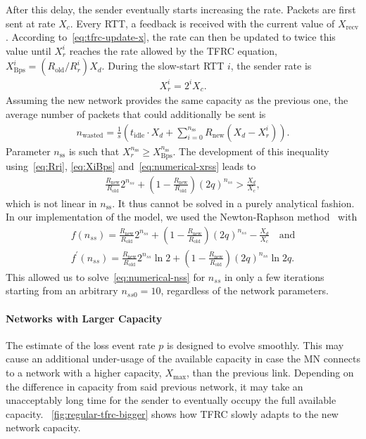 \documentclass[twocolumn]{nictatechreport}
\begin{document}
After this delay, the sender eventually starts increasing the rate. Packets are
first sent at rate $X_c$. Every RTT, a feedback is received with the current
value of $X_\mathrm{recv}$. According to~\eqref{eq:tfrc-update-x}, the rate can
then be updated to twice this value until $X_r^i$ reaches the rate allowed by
the TFRC equation, $X_\mathrm{Bps}^i = (R_\mathrm{old}/R_r^i)X_d$. During
the slow-start RTT $i$, the sender rate is
\begin{gather}
  \label{eq:numerical-xrss}
  X_r^i = 2^i X_c.
\end{gather}
Assuming the new network provides the same capacity as the previous one, the
average number of packets that could additionally be sent is 
\begin{gather}
  n_\mathrm{wasted} = \frac1s\left(t_\mathrm{idle} \cdot X_d + \sum_{i=0}^{n_\mathrm{ss}} R_\mathrm{new}
  \left( X_d - X_r^i \right)\right).
  \label{eq:numerical-packets-wasted}
\end{gather}
Parameter $n_\mathrm{ss}$ is such that $X_r^{n_\mathrm{ss}} \ge
X_\mathrm{Bps}^{n_\mathrm{ss}}$. The development of this inequality
using~\eqref{eq:Rri}, \eqref{eq:XiBps} and~\eqref{eq:numerical-xrss} leads to
\begin{gather}
  \frac{R_\mathrm{new}}{R_\mathrm{old}}2^{n_{ss}} + \left(1-\frac{R_\mathrm{new}}{R_\mathrm{old}}\right)(2q)^{n_{ss}} > \frac{X_d}{X_c},
  \label{eq:numerical-nss}
\end{gather}
which is not linear in $n_\mathrm{ss}$. It thus cannot be solved in a purely
analytical fashion. In our implementation of the model, we used the
Newton-Raphson method~\cite{1995ypma_newton-raphson} with 
\begin{gather}
  f(n_{ss}) = \frac{R_\mathrm{new}}{R_\mathrm{old}}2^{n_{ss}} + \left(1-\frac{R_\mathrm{new}}{R_\mathrm{old}}\right)(2q)^{n_{ss}} - \frac{X_d}{X_c}\quad\text{and} \\
  f^\prime(n_{ss}) = \frac{R_\mathrm{new}}{R_\mathrm{old}}2^{n_{ss}}\ln2 + \left(1-\frac{R_\mathrm{new}}{R_\mathrm{old}}\right)(2q)^{n_{ss}}\ln2q.
\end{gather}
This allowed us to solve~\eqref{eq:numerical-nss} for $n_{ss}$ in only a few
iterations starting from an arbitrary $n_{ss0} = 10$, regardless of the network
parameters.

\paragraph{Networks with Larger Capacity} The estimate of the loss event rate
$p$ is designed to evolve smoothly. This may cause an additional under-usage of
the available capacity in case the MN connects to a network with a higher
capacity, $X_\mathrm{max}$, than the previous link.  Depending on the difference
in capacity from said previous network, it may take an unacceptably long time
for the sender to eventually occupy the full available capacity.
\figurename~\ref{fig:regular-tfrc-bigger} shows how TFRC slowly adapts to the
new network capacity.
\end{document}
